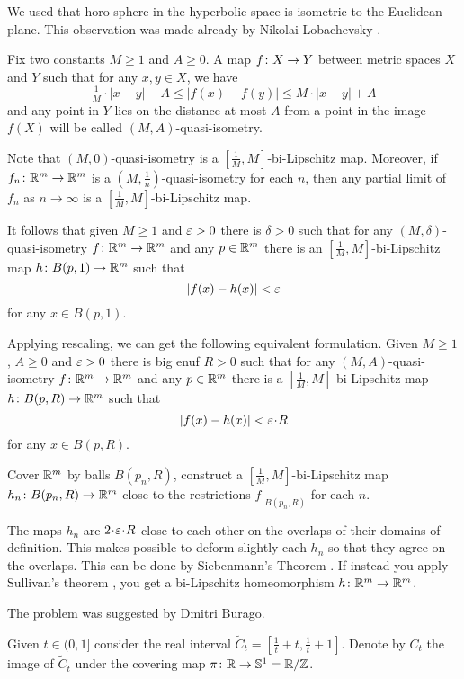 We used that horo-sphere in the hyperbolic space is isometric to the Euclidean plane.
This observation was made already by Nikolai Lobachevsky \cite[see 34 in][]{lobachevsky}.

Fix two constants $M\ge 1$ and $A\ge 0$.
A map $f\:X\z\to Y$ between metric spaces $X$ and $Y$ such that for any $x,y\in X$,
 we have
\[\tfrac1M\cdot |x-y|-A\le |f(x)-f(y)|\le M\cdot |x-y|+A\]
and any point in $Y$ lies on the distance at most $A$ from a point in the image $f(X)$
will be called $(M,A)$-quasi-isometry.

{\sloppy
Note that $(M,0)$-quasi-isometry is a $[\tfrac1M,M]$-bi-Lipschitz map.
Moreover,
if $f_n\colon\mathbb{R}^m\to\mathbb{R}^m$ is a  $(M,\frac1n)$-quasi-isometry 
for each $n$, 
then any partial limit of $f_n$ as $n\to\infty$
is a $[\tfrac1M,M]$-bi-Lipschitz map.

}

It follows that given $M\ge 1$ and $\varepsilon>0$ there is $\delta>0$ such that 
for any $(M,\delta)$-quasi-isometry $f\colon\mathbb{R}^m\to\mathbb{R}^m$ and any $p\in \mathbb{R}^m$
there is an $[\tfrac1M,M]$-bi-Lipschitz map $h\colon B(p,1)\to \mathbb{R}^m$
such that
\[|f(x)-h(x)|<\varepsilon\]
for any $x\in B(p,1)$.

Applying rescaling, we can get the following equivalent formulation. 
Given $M\ge 1$, $A\ge 0$ and $\varepsilon>0$
there is big enuf $R>0$ such that for any $(M,A)$-quasi-isometry 
$f\colon\mathbb{R}^m\to\mathbb{R}^m$ and any $p\in\mathbb{R}^m$ there is a $[\tfrac1M,M]$-bi-Lipschitz map $h\colon B(p,R)\to \mathbb{R}^m$
such that 
\[|f(x)-h(x)|<\eps\cdot R\]
for any $x\in B(p,R)$.

Cover $\mathbb{R}^m$ by balls
$B(p_n,R)$, construct a $[\tfrac1M,M]$-bi-Lipschitz map $h_n\colon B(p_n,R)\to \mathbb{R}^m$ close to the restrictions $f|_{B(p_n,R)}$ for each $n$.

The maps $h_n$ are $2\cdot \eps\cdot R$ close to each other on the overlaps of their domains of definition.
This makes possible to deform slightly each $h_n$ so that they agree on the overlaps.
This can be done by Siebenmann's Theorem \cite[see][]{siebenmann}.
If instead you apply Sullivan's theorem \cite[see][]{sullivan}, you get a bi-Lipschitz homeomorphism $h\:\RR^m\z\to\RR^m$.\qeds


The problem was suggested by Dmitri Burago.





Given $t\in (0,1]$ consider the real interval $\tilde C_t=[\tfrac 1t+t, \tfrac 1t+1]$.
Denote by $C_t$ the image of $\tilde C_t$ under the covering map $\pi\colon\mathbb{R}\to \mathbb{S}^1=\mathbb{R}/\mathbb{Z}$.

